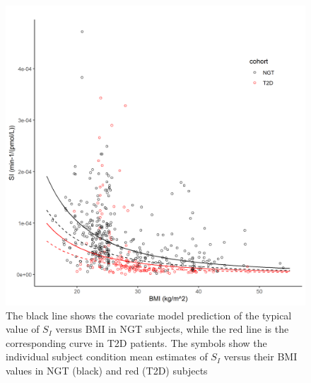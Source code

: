 \documentclass[utf8]{frontiersSCNS} %
\begin{document}
\begin{figure}[h!]
\begin{center}
\includegraphics[width=15cm]{SI_BMI.PNG}
\end{center}
\caption{The black line shows the covariate model prediction of the typical value of $S_I$ versus BMI in NGT subjects, while the red line is the corresponding curve in T2D patients. The symbols show the individual subject condition mean estimates of $S_I$ versus their BMI values in NGT (black) and red (T2D) subjects}
\label{fig: SI_BMI}
\end{figure}

\end{document}
